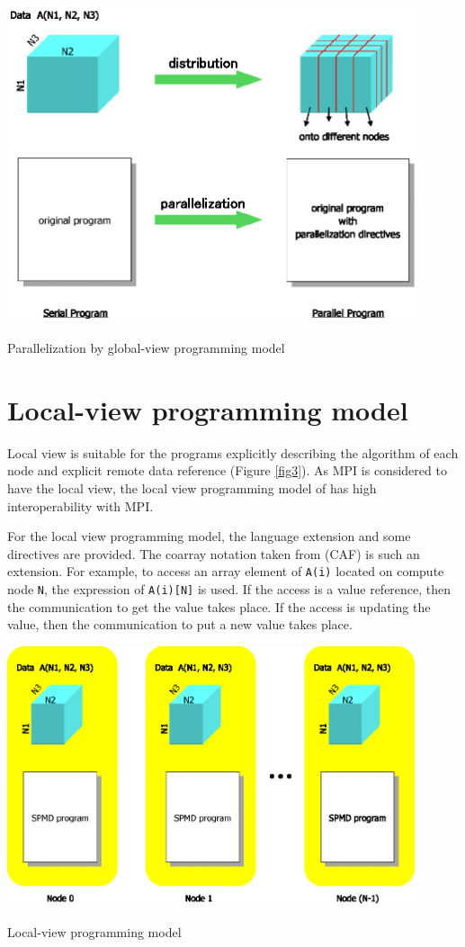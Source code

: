 \begin{myfigure}
\includegraphics[width=12cm]{figs/Fig2.eps}
  \caption{Parallelization by global-view programming model}
\label{fig2}
\end{myfigure}

\section{Local-view programming model}

Local view is suitable for the
programs explicitly describing the algorithm of each node and explicit
remote data reference (Figure \ref{fig3}). As MPI is
considered to have the local 
view, the local view programming model of \XMP has high
interoperability with MPI.

For the local view programming model,
the language extension and some directives are provided. The coarray
notation taken from \CAF (CAF) is such an extension. For
example, to access an array element of {\tt A(i)} located on compute
node {\tt N},
the expression of {\tt A(i)[N]} is used. If the access is a value reference,
then the communication to get the value takes place. If the access is
updating the value, then the communication to put a new value takes
place.

\begin{myfigure}
\includegraphics[width=12cm]{figs/Fig3.eps}
  \caption{Local-view programming model}
\label{fig3}
\end{myfigure}

